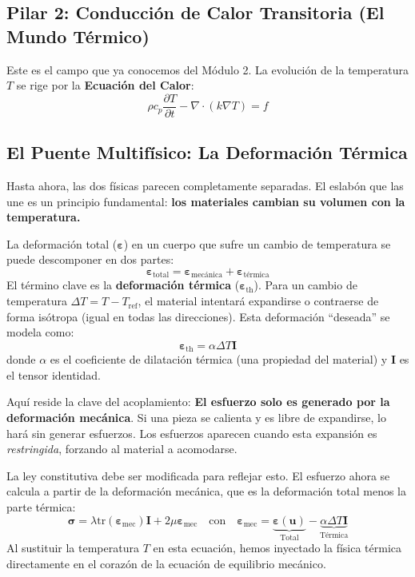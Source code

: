 \subsection{Pilar 2: Conducción de Calor Transitoria (El Mundo Térmico)}
Este es el campo que ya conocemos del Módulo 2. La evolución de la temperatura $T$ se rige por la \textbf{Ecuación del Calor}:
\begin{equation}
    \rho c_p \frac{\partial T}{\partial t} - \nabla \cdot (k \nabla T) = f
\end{equation}

\subsection{El Puente Multifísico: La Deformación Térmica}
Hasta ahora, las dos físicas parecen completamente separadas. El eslabón que las une es un principio fundamental: \textbf{los materiales cambian su volumen con la temperatura.}

La deformación total ($\bm{\varepsilon}$) en un cuerpo que sufre un cambio de temperatura se puede descomponer en dos partes:
$$ \bm{\varepsilon}_{\text{total}} = \bm{\varepsilon}_{\text{mecánica}} + \bm{\varepsilon}_{\text{térmica}} $$
El término clave es la \textbf{deformación térmica} ($\bm{\varepsilon}_{\text{th}}$). Para un cambio de temperatura $\Delta T = T - T_{\text{ref}}$, el material intentará expandirse o contraerse de forma isótropa (igual en todas las direcciones). Esta deformación ``deseada'' se modela como:
\begin{equation}
    \bm{\varepsilon}_{\text{th}} = \alpha \Delta T \mathbf{I}
\end{equation}
donde $\alpha$ es el coeficiente de dilatación térmica (una propiedad del material) y $\mathbf{I}$ es el tensor identidad.

Aquí reside la clave del acoplamiento: \textbf{El esfuerzo solo es generado por la deformación mecánica}. Si una pieza se calienta y es libre de expandirse, lo hará sin generar esfuerzos. Los esfuerzos aparecen cuando esta expansión es \textit{restringida}, forzando al material a acomodarse.

La ley constitutiva debe ser modificada para reflejar esto. El esfuerzo ahora se calcula a partir de la deformación mecánica, que es la deformación total menos la parte térmica:
\begin{equation}
    \bm{\sigma} = \lambda \text{tr}(\bm{\varepsilon}_{\text{mec}}) \mathbf{I} + 2\mu \bm{\varepsilon}_{\text{mec}} \quad \text{con} \quad \bm{\varepsilon}_{\text{mec}} = \underbrace{\bm{\varepsilon}(\mathbf{u})}_{\text{Total}} - \underbrace{\alpha \Delta T \mathbf{I}}_{\text{Térmica}}
\end{equation}
Al sustituir la temperatura $T$ en esta ecuación, hemos inyectado la física térmica directamente en el corazón de la ecuación de equilibrio mecánico.

